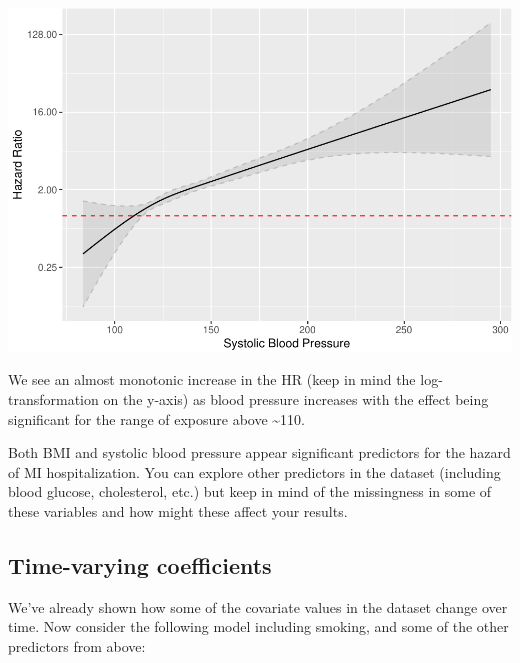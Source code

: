 \documentclass[
]{book}
\newenvironment{Shaded}{\begin{snugshade}}{\end{snugshade}}
\newcommand{\DataTypeTok}[1]{\textcolor[rgb]{0.13,0.29,0.53}{#1}}
\newcommand{\DecValTok}[1]{\textcolor[rgb]{0.00,0.00,0.81}{#1}}
\newcommand{\KeywordTok}[1]{\textcolor[rgb]{0.13,0.29,0.53}{\textbf{#1}}}
\newcommand{\NormalTok}[1]{#1}
\newcommand{\OperatorTok}[1]{\textcolor[rgb]{0.81,0.36,0.00}{\textbf{#1}}}
\newcommand{\StringTok}[1]{\textcolor[rgb]{0.31,0.60,0.02}{#1}}
\begin{document}
\includegraphics{adv_epi_analysis_files/figure-latex/unnamed-chunk-248-1.pdf}

We see an almost monotonic increase in the HR (keep in mind the log-transformation on the y-axis) as blood pressure increases with the effect being significant for the range of exposure above \textasciitilde110.

Both BMI and systolic blood pressure appear significant predictors for the hazard of MI hospitalization. You can explore other predictors in the dataset (including blood glucose, cholesterol, etc.) but keep in mind of the missingness in some of these variables and how might these affect your results.

\hypertarget{time-varying-coefficients}{%
\subsection{Time-varying coefficients}\label{time-varying-coefficients}}

We've already shown how some of the covariate values in the dataset change over time. Now consider the following model including smoking, and some of the other predictors from above:

\begin{Shaded}
\end{Shaded}
\end{document}
